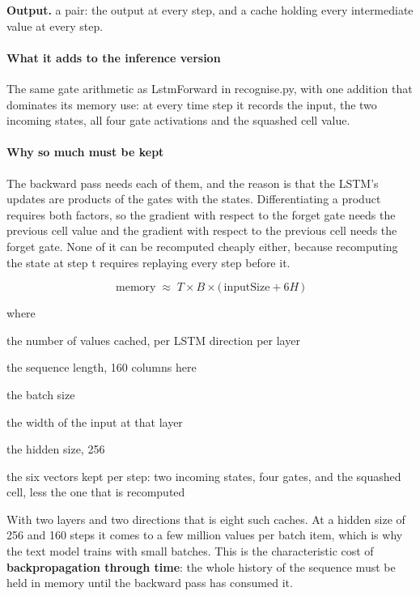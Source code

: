 \noindent\textbf{Output.} a pair: the output at every step, and a cache holding every intermediate value at every step.


\paragraph{What it adds to the inference version}
The same gate arithmetic as LstmForward in recognise.py, with one addition that dominates its memory use: at every time step it records the input, the two incoming states, all four gate activations and the squashed cell value.


\paragraph{Why so much must be kept}
The backward pass needs each of them, and the reason is that the LSTM's updates are products of the gates with the states. Differentiating a product requires both factors, so the gradient with respect to the forget gate needs the previous cell value and the gradient with respect to the previous cell needs the forget gate. None of it can be recomputed cheaply either, because recomputing the state at step t requires replaying every step before it.


\begin{equation}
\mathrm{memory} \;\approx\; T \times B \times \big(\,\mathrm{inputSize} + 6H\,\big)
\end{equation}

\noindent where
\begin{description}[leftmargin=2.4em,style=nextline,font=\normalfont\ttfamily]\setlength\itemsep{1pt}
  \item[{$\mathrm{memory}$}] \normalfont the number of values cached, per LSTM direction per layer
  \item[{$T$}] \normalfont the sequence length, 160 columns here
  \item[{$B$}] \normalfont the batch size
  \item[{$\mathrm{inputSize}$}] \normalfont the width of the input at that layer
  \item[{$H$}] \normalfont the hidden size, 256
  \item[{$6H$}] \normalfont the six vectors kept per step: two incoming states, four gates, and the squashed cell, less the one that is recomputed
\end{description}
With two layers and two directions that is eight such caches. At a hidden size of 256 and 160 steps it comes to a few million values per batch item, which is why the text model trains with small batches. This is the characteristic cost of \textbf{backpropagation through time}: the whole history of the sequence must be held in memory until the backward pass has consumed it.


